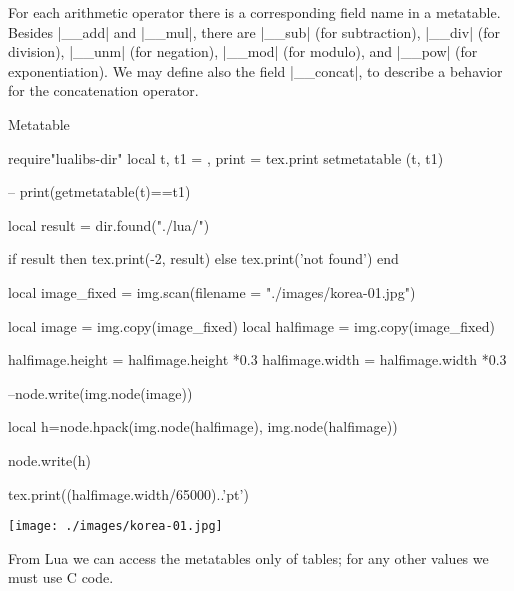 For each arithmetic operator there is a corresponding field name in a metatable.
Besides |__add| and |__mul|, there are |__sub| (for subtraction), |__div| (for division),
|__unm| (for negation), |__mod| (for modulo), and |__pow| (for exponentiation).
We may define also the field |__concat|, to describe a behavior for the concatenation
operator.


\begin{texexample}{Metatable}{}
\begin{luacode}
require"lualibs-dir"
local t, t1 = {}, {}
  print = tex.print
  setmetatable (t, t1)

-- print(getmetatable(t)==t1)

local result = dir.found("./lua/")

if result then tex.print(-2, result) else tex.print('not found')  end

local image_fixed = img.scan({filename = "./images/korea-01.jpg"})

local image     = img.copy(image_fixed)
local halfimage = img.copy(image_fixed)

halfimage.height = halfimage.height *0.3
halfimage.width  = halfimage.width  *0.3

--node.write(img.node(image))


local h=node.hpack(img.node(halfimage), img.node(halfimage))

node.write(h)

tex.print((halfimage.width/65000)..'pt')

\end{luacode}
\end{texexample}
\texttt{[image: ./images/korea-01.jpg]}








From Lua we can access the metatables only of tables; for any other values we must use C code. 
